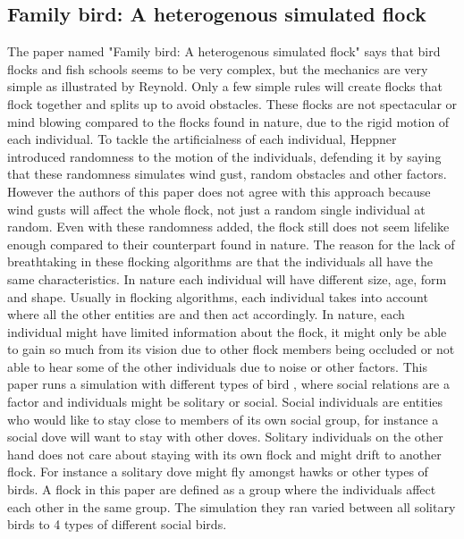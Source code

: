 \subsection{Family bird: A heterogenous simulated flock}
The paper named "Family bird: A heterogenous simulated flock" \cite{Demsar2013} says that bird flocks and fish schools seems to be very complex, but the mechanics are very simple as illustrated by Reynold. Only a few simple rules will create flocks that flock together and splits up to avoid obstacles. These flocks are not spectacular or mind blowing compared to the flocks found in nature, due to the rigid motion of each individual. To tackle the artificialness of each individual, Heppner introduced randomness to the motion of the individuals, defending it by saying that these randomness simulates wind gust, random obstacles and other factors. 
However the authors of this paper does not agree with this approach because wind gusts will affect the whole flock, not just a random single individual at random. Even with these randomness added, the flock still does not seem lifelike enough compared to their counterpart found in nature. The reason for the lack of breathtaking in these flocking algorithms are that the individuals all have the same characteristics. In nature each individual will have different size, age, form and shape. 
Usually in flocking algorithms, each individual takes into account where all the other entities are and then act accordingly. In nature, each individual might have limited information about the flock, it might only be able to gain so much from its vision due to other flock members being occluded or not able to hear some of the other individuals due to noise or other factors.
This paper runs a simulation with different types of bird , where social relations are a factor and individuals might be solitary or social. Social individuals are entities who would like to stay close to members of its own social group, for instance a social dove will want to stay with other doves. Solitary individuals on the other hand does not care about staying with its own flock and might drift to another flock. For instance a solitary dove might fly amongst hawks or other types of birds. A flock in this paper are defined as a group where the individuals affect each other in the same group. The simulation they ran varied between all solitary birds to 4 types of different social birds.

